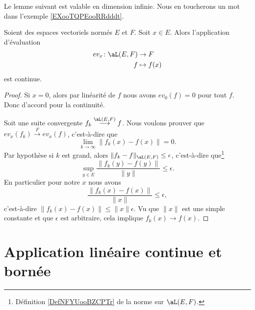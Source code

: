 Le lemme suivant est valable en dimension infinie. Nous en toucherons un mot dans l'exemple \ref{EXooTQPEooRRdddt}.
\begin{lemma}       \label{LEMooWFNXooLyTyyX}
    Soient des espaces vectoriels normés \( E\) et \( F\). Soit \( x\in E\). Alors l'application d'évaluation
    \begin{equation}
        \begin{aligned}
            ev_x\colon \aL(E,F)&\to F \\
            f&\mapsto f(x) 
        \end{aligned}
    \end{equation}
    est continue.
\end{lemma}

\begin{proof}
    Si \( x=0\), alors par linéarité de \( f\) nous avons \( ev_0(f)=0\) pour tout \( f\). Donc d'accord pour la continuité.

    Soit une suite convergente \( f_k\stackrel{\aL(E,F)}{\longrightarrow}f\). Nous voulons prouver que \( ev_x(f_k)\stackrel{F}{\longrightarrow}ev_x(f)\), c'est-à-dire que
    \begin{equation}
        \lim_{k\to \infty} \| f_k(x)-f(x) \|=0.
    \end{equation}
    Par hypothèse si \( k\) est grand, alors \( \| f_k-f  \|_{\aL(E,F)}\leq \epsilon\), c'est-à-dire que\footnote{Définition \ref{DefNFYUooBZCPTr} de la norme sur \( \aL(E,F)\).}
    \begin{equation}
        \sup_{y\in E}\frac{ \| f_k(y)-f(y) \| }{ \| y \| }\leq \epsilon.
    \end{equation}
    En particulier pour notre \( x\) nous avons
    \begin{equation}
        \frac{ \| f_k(x)-f(x) \| }{ \| x \| }\leq \epsilon,
    \end{equation}
    c'est-à-dire \( \| f_k(x)-f(x) \|\leq \| x \|\epsilon\). Vu que \( \| x \|\) est une simple constante et que \( \epsilon\) est arbitraire, cela implique \( f_k(x)\to f(x)\).
\end{proof}


\section{Application linéaire continue et bornée}

